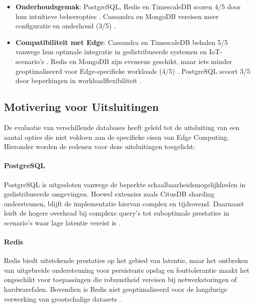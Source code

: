 \begin{itemize}
    \item \textbf{Onderhoudsgemak}: PostgreSQL, Redis en TimescaleDB scoren 4/5 door hun intuïtieve beheeropties \autocite{PostgreSQLDocumentation, RedisDocumentation, TimescaleDBDocumentation}. Cassandra en MongoDB vereisen meer configuratie en onderhoud (3/5) \autocite{CassandraDocumentation, MongoDBDocumentation}.
    \item \textbf{Compatibiliteit met Edge}: Cassandra en TimescaleDB behalen 5/5 vanwege hun optimale integratie in gedistribueerde systemen en IoT-scenario’s \autocite{CassandraDocumentation, TimescaleDBDocumentation}. Redis en MongoDB zijn eveneens geschikt, maar iets minder geoptimaliseerd voor Edge-specifieke workloads (4/5) \autocite{RedisDocumentation, MongoDBDocumentation}. PostgreSQL scoort 3/5 door beperkingen in workloadflexibiliteit \autocite{PostgreSQLDocumentation}.
\end{itemize}

\subsection{Motivering voor Uitsluitingen}

De evaluatie van verschillende databases heeft geleid tot de uitsluiting van een aantal opties die niet voldoen aan de specifieke eisen van Edge Computing. Hieronder worden de redenen voor deze uitsluitingen toegelicht:

\paragraph{PostgreSQL}
PostgreSQL is uitgesloten vanwege de beperkte schaalbaarheidsmogelijkheden in gedistribueerde omgevingen. Hoewel extensies zoals CitusDB sharding ondersteunen, blijft de implementatie hiervan complex en tijdrovend. Daarnaast leidt de hogere overhead bij complexe query’s tot suboptimale prestaties in scenario’s waar lage latentie vereist is \autocite{PostgreSQLDocumentation, Kleppmann2017}.

\paragraph{Redis}
Redis biedt uitstekende prestaties op het gebied van latentie, maar het ontbreken van uitgebreide ondersteuning voor persistente opslag en fouttolerantie maakt het ongeschikt voor toepassingen die robuustheid vereisen bij netwerkstoringen of hardwarefalen. Bovendien is Redis niet geoptimaliseerd voor de langdurige verwerking van grootschalige datasets \autocite{RedisDocumentation, Mahmud2020}.

